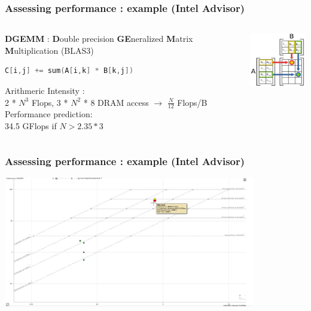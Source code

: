 \begin{frame}[containsverbatim]
\frametitle{Assessing performance : example (Intel Advisor)}
\begin{columns}[c]
	\begin{column}{7cm}

	\textbf{DGEMM} : \textbf{D}ouble precision \textbf{GE}neralized \textbf{M}atrix \textbf{M}ultiplication (BLAS3)

\begin{lstlisting}[language=C]
C[i,j] += sum(A[i,k] * B[k,j])
\end{lstlisting}

Arithmeric Intensity :
\\

2 * $N^3$ Flops, 3 * $N^2$ * 8 DRAM access $\rightarrow$ $\frac{N}{12}$ Flops/B
\\

Performance prediction:
\\
34.5 GFlops if $N > 2.35*3$


	\end{column} 

	\begin{column}{3cm}
	\begin{center}
	\includegraphics[width=3cm]{DayGilles/images/dgemm.jpg}
	\end{center}
	\end{column}
\end{columns} 
\end{frame}


\begin{frame}[containsverbatim]
\frametitle{Assessing performance : example (Intel Advisor)}
\begin{center}
\includegraphics[width=11cm]{DayGilles/images/advisor2.jpg}
\end{center}
\end{frame}


